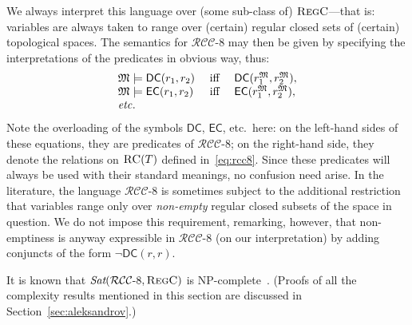 \documentclass{LMCS}
\theoremstyle{plain}
\newcommand{\RCCE}{\ensuremath{\mathcal{RCC}\text{-}8}}\newcommand{\RCCEcc}{\ensuremath{\RCCE{}cc}}\newcommand{\RCCEc}{\ensuremath{\RCCE{}c}}
\newcommand{\Sat}{\textit{Sat}}
\newcommand{\Regc}{\textsc{RegC}}
\newcommand{\NP}{\textsc{NP}}
\begin{document}
We always interpret this language over (some sub-class of)
$\Regc$---that is: variables are always taken to range over (certain)
regular closed sets of (certain) topological spaces.  The semantics
for $\RCCE$ may then be given by specifying the interpretations of the
predicates in obvious way, thus:
\begin{equation*}
\begin{array}{lcl}
\mathfrak{M} \models \mathsf{DC}(r_1,r_2)  &\mbox{ iff }
    &\mathsf{DC}(r_1^{\mathfrak{M}}, r_2^{\mathfrak{M}}), \\
\mathfrak{M} \models \mathsf{EC}(r_1,r_2)  &\mbox{ iff }
    &\mathsf{EC}(r_1^{\mathfrak{M}}, r_2^{\mathfrak{M}}),\\
{\it etc}. &&
\end{array}
\end{equation*}
Note the overloading of the symbols $\mathsf{DC}$,
$\mathsf{EC}$, etc.~here: on the left-hand sides of these
equations, they are predicates of $\RCCE$; on the right-hand side,
they denote the relations on $\textsc{RC}(T)$ defined in~\eqref{eq:rcc8}.
Since these predicates will always be used with their standard
meanings, no confusion need arise. In the literature, the language $\RCCE$ is
sometimes subject to the additional restriction that variables range
only over \emph{non-empty} regular closed subsets of the space in
question. We do not impose this requirement, remarking, however, that
non-emptiness is anyway expressible in $\RCCE$ (on our interpretation)
by adding conjuncts of the form $\neg \mathsf{DC}(r,r)$.



It is known that
$\Sat(\RCCE,\Regc)$ is \NP-complete~\cite{Renz98}. (Proofs of
all the complexity results mentioned in this section are discussed in
Section~\ref{sec:aleksandrov}.)
\end{document}
